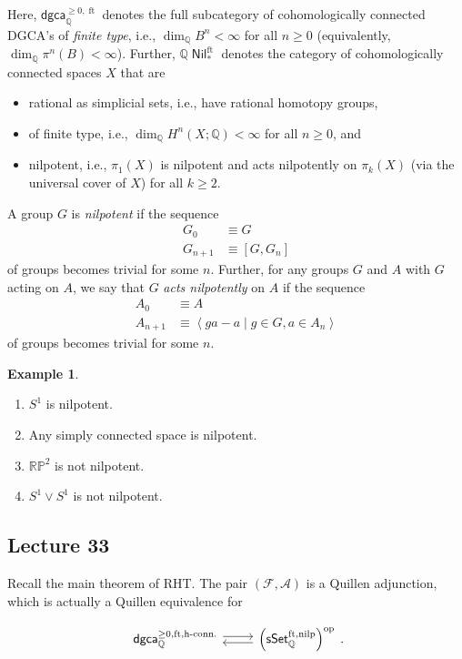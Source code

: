 \documentclass[10pt,letterpaper,cm]{nupset}
\theoremstyle{definition}
\newtheorem{exmp}[defn]{Example}
\theoremstyle{theorem}
\theoremstyle{remark}
\newcommand{\A}{\mathcal A}
\newcommand{\F}{\mathcal F}
\newcommand{\Q}{\mathbb Q}
\newcommand{\RP}{\mathbb{RP}}
\newcommand{\1}{\mathbb{1}}
\newcommand{\dgca}{\mathsf{dgca}}
\newcommand{\0}{\vec 0}
\DeclareMathOperator{\ft}{ft}
\DeclareMathOperator{\nil}{\mathsf{Nil}}
\DeclareMathOperator{\nilp}{nilp}
\DeclareMathOperator{\op}{op}
\newcommand{\bi}{\begin{itemize}}
\newcommand{\ei}{\end{itemize}}
\newcommand{\be}{\begin{enumerate}}
\newcommand{\ee}{\end{enumerate}}
\begin{document}
Here, $\dgca_{\Q}^{\geq 0, \ft}$ denotes the full subcategory of cohomologically connected DGCA's of \textit{finite type}, i.e., \linebreak $\dim_{\Q}B^n < \infty$ for all $n \geq 0$ (equivalently, $\dim_{\Q}\pi^n(B) < \infty$). Further, $\Q{\nil}_{\ast}^{\ft}$ denotes the category of cohomologically connected spaces $X$ that are

\bi
\item rational as simplicial sets, i.e., have rational homotopy groups,
\item of finite type, i.e., $\dim_{\Q}H^n(X;\Q) < \infty$ for all $n \geq 0$, and
\item nilpotent, i.e., $\pi_1(X)$ is nilpotent and acts nilpotently on $\pi_k(X)$ (via the universal cover of $X$) for all $k \geq 2$.
\ei

A group $G$ is \textit{nilpotent} if the sequence
\begin{align*}
G_0 &  \equiv G
\\ G_{n+1} & \equiv \left[G, G_n\right] 
\end{align*}
of groups becomes trivial for some $n$. Further, for any groups $G$ and $A$ with $G$ acting on $A$, we say that $G$ \textit{acts nilpotently} on $A$  if the sequence 
\begin{align*}
A_0 & \equiv A
\\ A_{n+1} & \equiv  \left\langle{ga - a \mid g \in G, a \in A_n}\right\rangle
\end{align*}
of groups becomes trivial for some $n$.


\begin{exmp} $ $
\be
\item $S^1$ is nilpotent.
\item Any simply connected space is nilpotent.
\item $\RP^2$ is not nilpotent.
\item $S^1 \vee S^1$ is not nilpotent.
\ee
\end{exmp}

\subsection{Lecture 33}

Recall the main theorem of RHT. The pair $\left(\F, \A\right)$ is a Quillen adjunction, which is actually a Quillen equivalence for

\[
\begin{tikzcd}
	{\dgca_{\Q}^{\geq 0, \ft, \text{h-conn.}}} & {\left(\mathsf{sSet}_{\Q}^{\ft, \nilp}\right)^{\op}}
	\arrow[shift left=1, from=1-1, to=1-2]
	\arrow[shift left=1, from=1-2, to=1-1]
\end{tikzcd}
.\]
\end{document}
